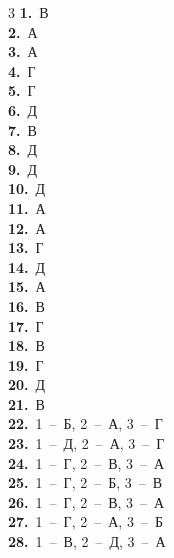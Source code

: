 \documentclass[12pt]{article}
\begin{document}
\begin{multicols}{3}\noindent
\textbf{1.}~В\\
\textbf{2.}~А\\
\textbf{3.}~А\\
\textbf{4.}~Г\\
\textbf{5.}~Г\\
\textbf{6.}~Д\\
\textbf{7.}~В\\
\textbf{8.}~Д\\
\textbf{9.}~Д\\
\textbf{10.}~Д\\
\textbf{11.}~А\\
\textbf{12.}~А\\
\textbf{13.}~Г\\
\textbf{14.}~Д\\
\textbf{15.}~А\\
\textbf{16.}~В\\
\textbf{17.}~Г\\
\textbf{18.}~В\\
\textbf{19.}~Г\\
\textbf{20.}~Д\\
\textbf{21.}~В\\
\textbf{22.}~1~--~Б, 2~--~А, 3~--~Г\\
\textbf{23.}~1~--~Д, 2~--~А, 3~--~Г\\
\textbf{24.}~1~--~Г, 2~--~В, 3~--~А\\
\textbf{25.}~1~--~Г, 2~--~Б, 3~--~В\\
\textbf{26.}~1~--~Г, 2~--~В, 3~--~А\\
\textbf{27.}~1~--~Г, 2~--~А, 3~--~Б\\
\textbf{28.}~1~--~В, 2~--~Д, 3~--~А\\
\end{multicols}
\end{document}
